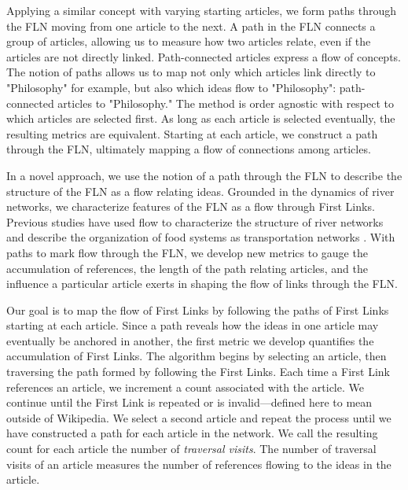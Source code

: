 \documentclass[pre,twocolumn,twoside,superscriptaddress,floatfix, aps, 10pt]{revtex4-1}
\begin{document}
Applying a similar concept with  
varying starting articles, we form 
paths through the FLN moving from one article to the next.
A path in the FLN connects a group of articles, allowing us to measure how two articles relate,
even if the articles are not directly linked. 
Path-connected articles express a flow of concepts.
The notion of paths allows us to map not only which articles link directly to "Philosophy" 
for example, but also which ideas flow to "Philosophy":
path-connected articles to "Philosophy."
The method is order agnostic with respect to which articles are selected first. As long as each article is selected eventually, the resulting metrics are equivalent.
Starting at each article, we construct a path through the FLN, 
ultimately mapping a flow of connections among articles.

In a novel approach, we use the notion of a path through the FLN to describe 
the structure of the FLN as a flow relating ideas. 
Grounded in the dynamics of river networks,
\cite{geo_basins}
we characterize features of the FLN as a flow through First Links.
Previous studies have used flow to characterize the structure of river networks
\cite{dodds} and describe the organization of food systems as transportation networks
\cite{food_webs}.
With paths to mark flow through the FLN, we develop new metrics to 
gauge the accumulation of references, 
the length of the path relating articles, and the influence a particular
article exerts in shaping the flow of links through the FLN.


Our goal is to map the flow of First Links by following the paths of First Links 
starting at each article. 
Since a path reveals how the ideas in one article may eventually be 
anchored in another, the first metric we develop quantifies the accumulation of First Links.
The algorithm begins by selecting an article, then traversing the path formed
by following the First Links. Each time a First Link references an article, we increment a count
associated with the article. 
We continue until the First Link is repeated or is invalid---defined here to mean outside of Wikipedia.
We select a second article and repeat the process until we have 
constructed a path for each article in the network. We call the resulting count for each article the number of {\it traversal visits}. The number of traversal visits of an article 
measures the number of references flowing to the ideas in the article. 
\end{document}
